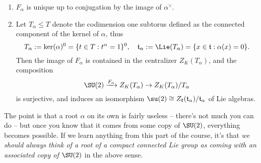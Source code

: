 \documentclass[reqno]{amsart} 
\begin{document}
\begin{theorem}
\begin{enumerate}
  \item $F_\alpha$ is unique up to conjugation by the image of $\alpha^\vee$.
  \item \label{item:image-F-alpha} Let $T_\alpha \leq T$ denote the codimension one subtorus defined as the connected component of the kernel of $\alpha$, thus
    \begin{equation*}
      T_\alpha := \ker(\alpha)^0 = \{t \in T : t^\alpha = 1\}^0, \quad \mathfrak{t}_\alpha := \Lie(T_\alpha) = \{x \in \mathfrak{t} : \alpha(x) = 0\}.
    \end{equation*}
    Then the image of $F_\alpha$ is contained in the centralizer $Z_K(T_\alpha)$, and the composition
    \begin{equation*}
      \SU(2) \xrightarrow{F_\alpha } Z_K(T_\alpha)
      \rightarrow Z_K(T_\alpha)/T_\alpha
    \end{equation*}
    is surjective, and induces an isomorphism $\su(2) \cong Z_{\mathfrak{k}}(\mathfrak{t}_\alpha) / \mathfrak{t}_\alpha$ of Lie algebras.
  \end{enumerate}
\end{theorem}

The point is that a root $\alpha$ on its own is fairly useless -- there's not much you can do -- but once you know that it comes from some copy of $\SU(2)$, everything becomes possible.  If we learn anything from this part of the course, it's that \emph{we should always think of a root of a compact connected Lie group as coming with an associated copy of $\SU(2)$} in the above sense.
\end{document}
